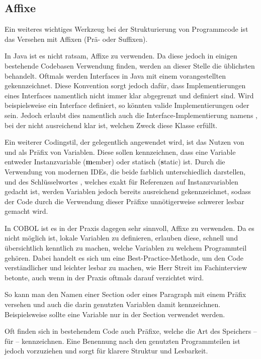 \subsection{Affixe} \label{affix}\label{affixCOBOL}
Ein weiteres wichtiges Werkzeug bei der Strukturierung von Programmcode ist das Versehen mit Affixen (Prä- oder Suffixen).

In Java ist es nicht ratsam, Affixe zu verwenden. Da diese jedoch in einigen bestehende Codebasen Verwendung finden, werden an dieser Stelle die üblichsten behandelt.
Oftmals werden Interfaces in Java mit einem vorangestellten  gekennzeichnet. Diese Konvention sorgt jedoch dafür, dass Implementierungen eines Interfaces namentlich nicht immer klar abgegrenzt und definiert sind. Wird beispielsweise ein Interface  definiert, so könnten valide Implementierungen  oder  sein. Jedoch erlaubt dies namentlich auch die Interface-Implementierung namens , bei der nicht ausreichend klar ist, welchen Zweck diese Klasse erfüllt.

Ein weiterer Codingstil, der gelegentlich angewendet wird, ist das Nutzen von  und  als Präfix von Variablen. Diese sollen kennzeichnen, dass eine Variable entweder Instanzvariable (\textbf{m}ember) oder statisch (\textbf{s}tatic) ist. Durch die Verwendung von modernen IDEs, die beide farblich unterschiedlich darstellen, und des Schlüsselwortes , welches exakt für Referenzen auf Instanzvariablen gedacht ist, werden Variablen jedoch bereits ausreichend gekennzeichnet, sodass der Code durch die Verwendung dieser Präfixe unnötigerweise schwerer lesbar gemacht wird.

In COBOL ist es in der Praxis dagegen sehr sinnvoll, Affixe zu verwenden. Da es nicht möglich ist, lokale Variablen zu definieren, erlauben diese, schnell und übersichtlich kenntlich zu machen, welche Variablen zu welchem Programmteil gehören. Dabei handelt es sich um eine Best-Practice-Methode, um den Code verständlicher und leichter lesbar zu machen, wie Herr Streit im Fachinterview betonte, auch wenn in der Praxis oftmals darauf verzichtet wird.

So kann man den Namen einer Section oder eines Paragraph mit einem Präfix versehen und auch die darin genutzten Variablen damit kennzeichnen. Beispielsweise sollte eine Variable  nur in der Section  verwendet werden. 

Oft finden sich in bestehendem Code auch Präfixe, welche die Art des Speichers -- \zB {} für  -- kennzeichnen. Eine Benennung nach den genutzten Programmteilen ist jedoch vorzuziehen und sorgt für klarere Struktur und Lesbarkeit.


